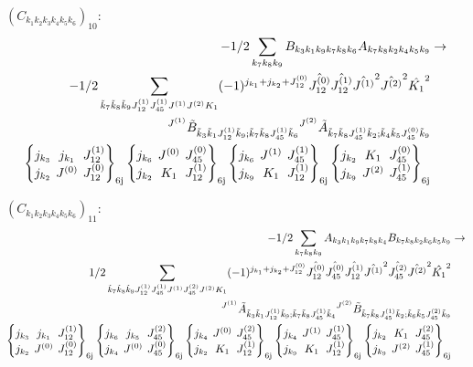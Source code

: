 \documentclass[11pt]{article}
\newcommand{\sixj}[6]{\begingroup\setlength{\arraycolsep}{0.2em}\begin{Bmatrix} #1 & #2 & #3 \\ #4 & #5 & #6 \end{Bmatrix}_{\text{6j}}\endgroup}
\begin{document}
$\left({C}_{{k}_{1}{k}_{2}{k}_{3}{k}_{4}{k}_{5}{k}_{6}}\right)_{10}$:
\begin{align}
-1/2\sum_{{k}_{7}{k}_{8}{k}_{9}}{B}_{{k}_{3}{k}_{1}{k}_{9}{k}_{7}{k}_{8}{k}_{6}}{A}_{{k}_{7}{k}_{8}{k}_{2}{k}_{4}{k}_{5}{k}_{9}}&\rightarrow \notag \\-1/2\sum_{\tilde{k}_{7}\tilde{k}_{8}\tilde{k}_{9}J^{(1)}_{12}J^{(1)}_{45}J^{(1)}J^{(2)}K_{1}}(-1)^{j_{{k}_{1}} +j_{{k}_{2}} +J^{(0)}_{12} }\hat{J^{(0)}_{12}}\hat{J^{(1)}_{12}}\hat{J^{(1)}}^{2}\hat{J^{(2)}}^{2}\hat{K_{1}}^{2}& \notag \\{}^{J^{(1)}}\tilde{B}_{\tilde{k}_{3}\tilde{k}_{1}J^{(1)}_{12}\tilde{k}_{9};\tilde{k}_{7}\tilde{k}_{8}J^{(1)}_{45}\tilde{k}_{6}}{}^{J^{(2)}}\tilde{A}_{\tilde{k}_{7}\tilde{k}_{8}J^{(1)}_{45}\tilde{k}_{2};\tilde{k}_{4}\tilde{k}_{5}J^{(0)}_{45}\tilde{k}_{9}}& \notag \\\sixj{j_{{k}_{3}}}{j_{{k}_{1}}}{J^{(1)}_{12}}{j_{{k}_{2}}}{J^{(0)}}{J^{(0)}_{12}}\sixj{j_{{k}_{6}}}{J^{(0)}}{J^{(0)}_{45}}{j_{{k}_{2}}}{K_{1}}{J^{(1)}_{12}}\sixj{j_{{k}_{6}}}{J^{(1)}}{J^{(1)}_{45}}{j_{{k}_{9}}}{K_{1}}{J^{(1)}_{12}}\sixj{j_{{k}_{2}}}{K_{1}}{J^{(0)}_{45}}{j_{{k}_{9}}}{J^{(2)}}{J^{(1)}_{45}}
\end{align}

$\left({C}_{{k}_{1}{k}_{2}{k}_{3}{k}_{4}{k}_{5}{k}_{6}}\right)_{11}$:
\begin{align}
-1/2\sum_{{k}_{7}{k}_{8}{k}_{9}}{A}_{{k}_{3}{k}_{1}{k}_{9}{k}_{7}{k}_{8}{k}_{4}}{B}_{{k}_{7}{k}_{8}{k}_{2}{k}_{6}{k}_{5}{k}_{9}}&\rightarrow \notag \\1/2\sum_{\tilde{k}_{7}\tilde{k}_{8}\tilde{k}_{9}J^{(1)}_{12}J^{(1)}_{45}J^{(1)}J^{(2)}_{45}J^{(2)}K_{1}}(-1)^{j_{{k}_{1}} +j_{{k}_{2}} +J^{(0)}_{12} }\hat{J^{(0)}_{12}}\hat{J^{(0)}_{45}}\hat{J^{(1)}_{12}}\hat{J^{(1)}}^{2}\hat{J^{(2)}_{45}}\hat{J^{(2)}}^{2}\hat{K_{1}}^{2}& \notag \\{}^{J^{(1)}}\tilde{A}_{\tilde{k}_{3}\tilde{k}_{1}J^{(1)}_{12}\tilde{k}_{9};\tilde{k}_{7}\tilde{k}_{8}J^{(1)}_{45}\tilde{k}_{4}}{}^{J^{(2)}}\tilde{B}_{\tilde{k}_{7}\tilde{k}_{8}J^{(1)}_{45}\tilde{k}_{2};\tilde{k}_{6}\tilde{k}_{5}J^{(2)}_{45}\tilde{k}_{9}}& \notag \\\sixj{j_{{k}_{3}}}{j_{{k}_{1}}}{J^{(1)}_{12}}{j_{{k}_{2}}}{J^{(0)}}{J^{(0)}_{12}}\sixj{j_{{k}_{6}}}{j_{{k}_{5}}}{J^{(2)}_{45}}{j_{{k}_{4}}}{J^{(0)}}{J^{(0)}_{45}}\sixj{j_{{k}_{4}}}{J^{(0)}}{J^{(2)}_{45}}{j_{{k}_{2}}}{K_{1}}{J^{(1)}_{12}}\sixj{j_{{k}_{4}}}{J^{(1)}}{J^{(1)}_{45}}{j_{{k}_{9}}}{K_{1}}{J^{(1)}_{12}}\sixj{j_{{k}_{2}}}{K_{1}}{J^{(2)}_{45}}{j_{{k}_{9}}}{J^{(2)}}{J^{(1)}_{45}}
\end{align}
\end{document}
